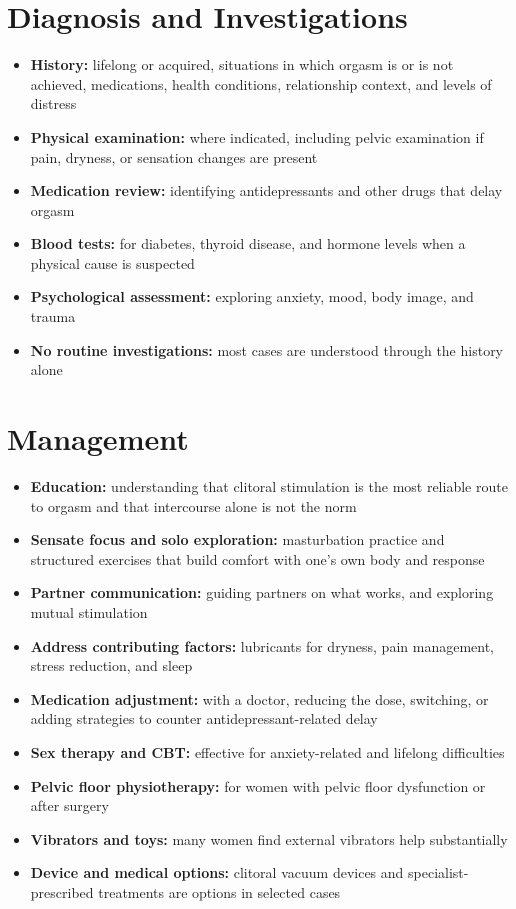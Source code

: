 \section*{Diagnosis and Investigations}
\begin{itemize}
    \item \textbf{History:} lifelong or acquired, situations in which orgasm is or is not achieved, medications, health conditions, relationship context, and levels of distress
    \item \textbf{Physical examination:} where indicated, including pelvic examination if pain, dryness, or sensation changes are present
    \item \textbf{Medication review:} identifying antidepressants and other drugs that delay orgasm
    \item \textbf{Blood tests:} for diabetes, thyroid disease, and hormone levels when a physical cause is suspected
    \item \textbf{Psychological assessment:} exploring anxiety, mood, body image, and trauma
    \item \textbf{No routine investigations:} most cases are understood through the history alone
\end{itemize}

\section*{Management}
\begin{itemize}
    \item \textbf{Education:} understanding that clitoral stimulation is the most reliable route to orgasm and that intercourse alone is not the norm
    \item \textbf{Sensate focus and solo exploration:} masturbation practice and structured exercises that build comfort with one's own body and response
    \item \textbf{Partner communication:} guiding partners on what works, and exploring mutual stimulation
    \item \textbf{Address contributing factors:} lubricants for dryness, pain management, stress reduction, and sleep
    \item \textbf{Medication adjustment:} with a doctor, reducing the dose, switching, or adding strategies to counter antidepressant-related delay
    \item \textbf{Sex therapy and CBT:} effective for anxiety-related and lifelong difficulties
    \item \textbf{Pelvic floor physiotherapy:} for women with pelvic floor dysfunction or after surgery
    \item \textbf{Vibrators and toys:} many women find external vibrators help substantially
    \item \textbf{Device and medical options:} clitoral vacuum devices and specialist-prescribed treatments are options in selected cases
\end{itemize}

